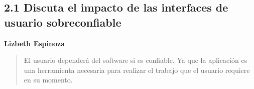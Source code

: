 \subsection*{2.1 Discuta el impacto de las interfaces de usuario sobreconfiable}

\textbf{Lizbeth Espinoza}

\begin{quote}
	El usuario dependerá del software si es confiable. Ya que la aplicación es una herramienta necesaria para realizar el trabajo que el usuario requiere en su momento.
\end{quote}